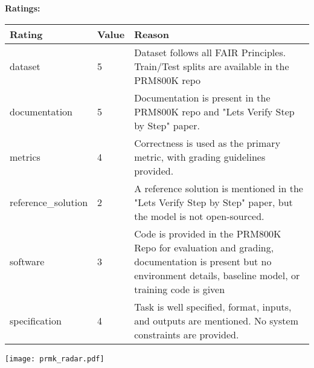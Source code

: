{{{\bf Ratings:} ~ \\

\begin{tabular}{p{} p{} p{}}
\hline
Rating & Value & Reason \\
\hline
dataset & 5 & Dataset follows all FAIR Principles. Train/Test splits are available in the PRM800K repo
 \\
documentation & 5 & Documentation is present in the PRM800K repo and "Lets Verify Step by Step" paper.
 \\
metrics & 4 & Correctness is used as the primary metric, with grading guidelines provided.
 \\
reference\_solution & 2 & A reference solution is mentioned in the "Lets Verify Step by Step" paper, but the model is not open-sourced.
 \\
software & 3 & Code is provided in the PRM800K Repo for evaluation and grading, documentation is present but no environment details, baseline model, or training code is given
 \\
specification & 4 & Task is well specified, format, inputs, and outputs are mentioned. No system constraints are provided.
 \\
\hline
\end{tabular}

\texttt{[image: prmk\_radar.pdf]}
}}
\clearpage